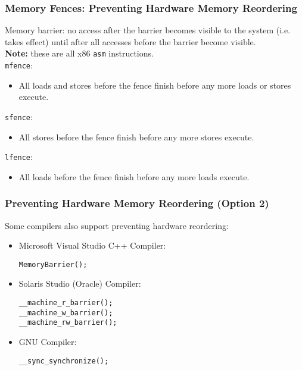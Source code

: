 \begin{frame}
  \frametitle{Memory Fences: Preventing Hardware Memory Reordering}


Memory barrier: no access after the barrier becomes visible to the
system (i.e. takes effect) until after all accesses before the barrier
become visible.\\[1em]

  {\bf Note:} these are all x86 {\tt asm} instructions.\\[1em]
  {\tt mfence}:
  \begin{itemize}
    \item All loads and stores before the fence finish before any more loads or stores execute.
  \end{itemize}
  {\tt sfence}:
  \begin{itemize}
    \item All stores before the fence finish before any more stores execute.
  \end{itemize}
  {\tt lfence}:
  \begin{itemize}
    \item All loads before the fence finish before any more loads execute.
  \end{itemize}
  
\end{frame}

\begin{frame}[fragile]
  \frametitle{Preventing Hardware Memory Reordering (Option 2)}

  
  Some compilers also support preventing hardware reordering:

\begin{itemize}
  \item Microsoft Visual Studio C++ Compiler:
  \begin{lstlisting}
MemoryBarrier();
  \end{lstlisting}

  \item Solaris Studio (Oracle) Compiler:
  \begin{lstlisting}
__machine_r_barrier();
__machine_w_barrier();
__machine_rw_barrier();
  \end{lstlisting}

  \item GNU Compiler:
  \begin{lstlisting}
__sync_synchronize();
  \end{lstlisting}
\end{itemize}
  
\end{frame}

